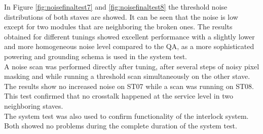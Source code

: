 In Figure \ref{fig:noisefinaltest7} and \ref{fig:noisefinaltest8} the threshold noise distributions of both staves are showed. It can be seen that the noise is low except for two modules that are neighboring the broken ones. The results obtained for different tunings showed excellent performance with a slightly lower and more homogeneous noise level compared to the QA, as a more sophisticated powering and grounding schema is used in the system test.\\
A noise scan was performed directly after tuning, after several steps of noisy pixel masking and while running a threshold scan simultaneously on the other stave. The results show no increased noise on ST07 while a scan was running on ST08. This test confirmed that no crosstalk happened at the service level in two neighboring staves.\\
The system test was also used to confirm functionality of the interlock system. Both showed no problems during the complete duration of the system test.\\
%

